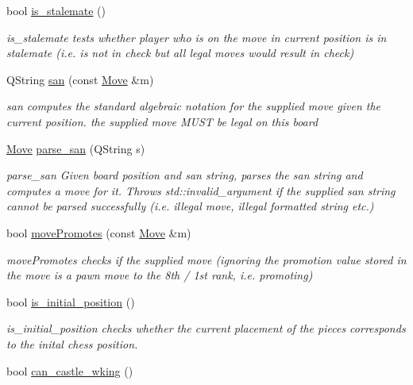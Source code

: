 \begin{DoxyCompactItemize}
bool \hyperlink{classchess_1_1Board_a7ff751702f53df82a8af55d66f187f66}{is\-\_\-stalemate} ()
\begin{DoxyCompactList}\small\item\em is\-\_\-stalemate tests whether player who is on the move in current position is in stalemate (i.\-e. is not in check but all legal moves would result in check) \end{DoxyCompactList}\item 
Q\-String \hyperlink{classchess_1_1Board_a2c498a11b0432a8c41a9dcece41612b7}{san} (const \hyperlink{classchess_1_1Move}{Move} \&m)
\begin{DoxyCompactList}\small\item\em san computes the standard algebraic notation for the supplied move given the current position. the supplied move M\-U\-S\-T be legal on this board \end{DoxyCompactList}\item 
\hyperlink{classchess_1_1Move}{Move} \hyperlink{classchess_1_1Board_a872aeef9bac835b88393092229685410}{parse\-\_\-san} (Q\-String s)
\begin{DoxyCompactList}\small\item\em parse\-\_\-san Given board position and san string, parses the san string and computes a move for it. Throws std\-::invalid\-\_\-argument if the supplied san string cannot be parsed successfully (i.\-e. illegal move, illegal formatted string etc.) \end{DoxyCompactList}\item 
bool \hyperlink{classchess_1_1Board_a422f4f975a7946ad593e870aa46cec89}{move\-Promotes} (const \hyperlink{classchess_1_1Move}{Move} \&m)
\begin{DoxyCompactList}\small\item\em move\-Promotes checks if the supplied move (ignoring the promotion value stored in the move is a pawn move to the 8th / 1st rank, i.\-e. promoting) \end{DoxyCompactList}\item 
bool \hyperlink{classchess_1_1Board_af20f52e22fd1f61458f523eb6c1e9c7b}{is\-\_\-initial\-\_\-position} ()
\begin{DoxyCompactList}\small\item\em is\-\_\-initial\-\_\-position checks whether the current placement of the pieces corresponds to the inital chess position. \end{DoxyCompactList}\item 
bool \hyperlink{classchess_1_1Board_a89e8eecec4bae12a4018228fbb94ff1c}{can\-\_\-castle\-\_\-wking} ()

\end{DoxyCompactItemize}
